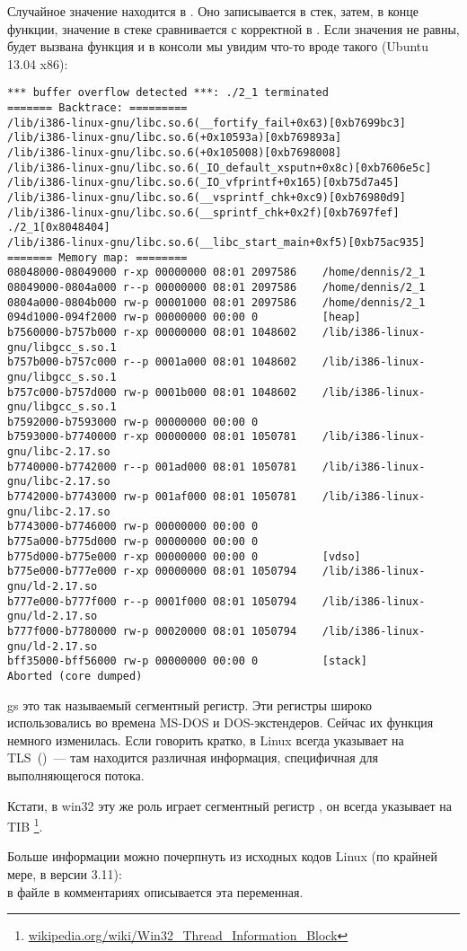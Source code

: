 Случайное значение находится в . 
Оно записывается в стек, затем, в конце функции, значение в стеке
сравнивается с корректной  в . 
Если значения не равны, будет вызвана функция 
 и в консоли мы увидим что-то вроде такого
 (Ubuntu 13.04 x86):

\begin{lstlisting}
*** buffer overflow detected ***: ./2_1 terminated
======= Backtrace: =========
/lib/i386-linux-gnu/libc.so.6(__fortify_fail+0x63)[0xb7699bc3]
/lib/i386-linux-gnu/libc.so.6(+0x10593a)[0xb769893a]
/lib/i386-linux-gnu/libc.so.6(+0x105008)[0xb7698008]
/lib/i386-linux-gnu/libc.so.6(_IO_default_xsputn+0x8c)[0xb7606e5c]
/lib/i386-linux-gnu/libc.so.6(_IO_vfprintf+0x165)[0xb75d7a45]
/lib/i386-linux-gnu/libc.so.6(__vsprintf_chk+0xc9)[0xb76980d9]
/lib/i386-linux-gnu/libc.so.6(__sprintf_chk+0x2f)[0xb7697fef]
./2_1[0x8048404]
/lib/i386-linux-gnu/libc.so.6(__libc_start_main+0xf5)[0xb75ac935]
======= Memory map: ========
08048000-08049000 r-xp 00000000 08:01 2097586    /home/dennis/2_1
08049000-0804a000 r--p 00000000 08:01 2097586    /home/dennis/2_1
0804a000-0804b000 rw-p 00001000 08:01 2097586    /home/dennis/2_1
094d1000-094f2000 rw-p 00000000 00:00 0          [heap]
b7560000-b757b000 r-xp 00000000 08:01 1048602    /lib/i386-linux-gnu/libgcc_s.so.1
b757b000-b757c000 r--p 0001a000 08:01 1048602    /lib/i386-linux-gnu/libgcc_s.so.1
b757c000-b757d000 rw-p 0001b000 08:01 1048602    /lib/i386-linux-gnu/libgcc_s.so.1
b7592000-b7593000 rw-p 00000000 00:00 0
b7593000-b7740000 r-xp 00000000 08:01 1050781    /lib/i386-linux-gnu/libc-2.17.so
b7740000-b7742000 r--p 001ad000 08:01 1050781    /lib/i386-linux-gnu/libc-2.17.so
b7742000-b7743000 rw-p 001af000 08:01 1050781    /lib/i386-linux-gnu/libc-2.17.so
b7743000-b7746000 rw-p 00000000 00:00 0
b775a000-b775d000 rw-p 00000000 00:00 0
b775d000-b775e000 r-xp 00000000 00:00 0          [vdso]
b775e000-b777e000 r-xp 00000000 08:01 1050794    /lib/i386-linux-gnu/ld-2.17.so
b777e000-b777f000 r--p 0001f000 08:01 1050794    /lib/i386-linux-gnu/ld-2.17.so
b777f000-b7780000 rw-p 00020000 08:01 1050794    /lib/i386-linux-gnu/ld-2.17.so
bff35000-bff56000 rw-p 00000000 00:00 0          [stack]
Aborted (core dumped)
\end{lstlisting}

gs это так называемый сегментный регистр. Эти регистры широко использовались во времена MS-DOS 
и DOS-экстендеров.
Сейчас их функция немного изменилась.
Если говорить кратко, в Linux  всегда указывает на \ac{TLS}~()~--- там находится различная 
информация, специфичная для выполняющегося потока.

Кстати, в win32 эту же роль играет сегментный регистр ,
он всегда указывает на
\ac{TIB} \footnote{\href{http://go.yurichev.com/17104}{wikipedia.org/wiki/Win32\_Thread\_Information\_Block}}. 

Больше информации можно почерпнуть из исходных кодов Linux (по крайней мере, в версии 3.11):\\
в файле  в комментариях описывается эта переменная.


